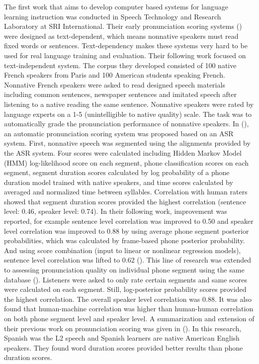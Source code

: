 The first work that aims to develop computer based systems for language learning instruction was conducted in Speech Technology and Research Laboratory at SRI International. Their early pronunciation scoring systems (\cite{bernstein1990automatic}) were designed as text-dependent, which means nonnative speakers must read fixed words or sentences. Text-dependency makes these systems very hard to be used for real language training and evaluation. Their following work focused on text-independent system. The corpus they developed consisted of 100 native French speakers from Paris and 100 American students speaking French. Nonnative French speakers were asked to read designed speech materials including common sentences, newspaper sentences and imitated speech after listening to a native reading the same sentence. Nonnative speakers were rated by language experts on a 1-5 (unintelligible to native quality) scale. The task was to automatically grade the pronunciation performance of nonnative speakers. In (\cite{neumeyer1996automatic}), an automatic pronunciation scoring system was proposed based on an ASR system. First, nonnative speech was segmented using the alignments provided by the ASR system. Four scores were calculated including Hidden Markov Model (HMM) log-likelihood score on each segment, phone classification scores on each segment, segment duration scores calculated by log probability of a phone duration model trained with native speakers, and time scores calculated by averaged and normalized time between syllables. Correlation with human raters showed that segment duration scores provided the highest correlation (sentence level: 0.46, speaker level: 0.74). In their following work, improvement was reported, for example sentence level correlation was improved to 0.50 and speaker level correlation was improved to 0.88 by using average phone segment posterior probabilities, which was calculated by frame-based phone posterior probability. And using score combination (input to linear or nonlinear regression models), sentence level correlation was lifted to 0.62 (\cite{franco1997automatic}). This line of research was extended to assessing pronunciation quality on individual phone segment using the same database (\cite{kim1997automatic}). Listeners were asked to only rate certain segments and same scores were calculated on each segment. Still, log-posterior probability scores provided the highest correlation. The overall speaker level correlation was 0.88. It was also found that human-machine correlation was higher than human-human correlation on both phone segment level and speaker level. A summarization and extension of their previous work on pronunciation scoring was given in (\cite{xi2010eduspeak}). In this research, Spanish was the L2 speech and Spanish learners are native American English speakers. They found word duration scores provided better results than phone duration scores.

